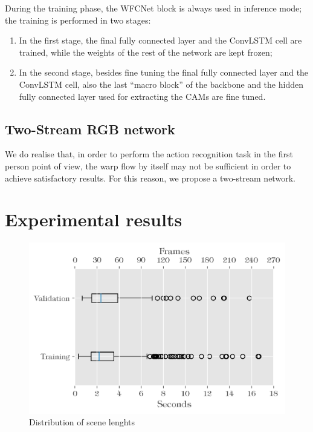 \documentclass[10pt,twocolumn,letterpaper]{article}
\begin{document}
During the training phase, the WFCNet block is always used in inference mode; the training is performed in two stages:
\begin{enumerate}
	\item In the first stage, the final fully connected layer and the ConvLSTM cell are trained, while the weights of the rest of the network are kept frozen;
	\item In the second stage, besides fine tuning the final fully connected layer and the ConvLSTM cell, also the last ``macro block'' of the backbone and the hidden fully connected layer used for extracting the CAMs are fine tuned.
\end{enumerate}

\subsection{Two-Stream RGB network}


We do realise that, in order to perform the action recognition task in the first person point of view, the warp flow by itself may not be sufficient in order to achieve satisfactory results. For this reason, we propose a two-stream network.

 

\section{Experimental results}

\begin{figure}
	\begin{center}
		\includegraphics[width=\linewidth]{grafici/GTEA61_boxplot.png}		
	\end{center}
	\caption{Distribution of scene lenghts}
	\label{fig:GTEA61_boxplot}
\end{figure}
\end{document}
